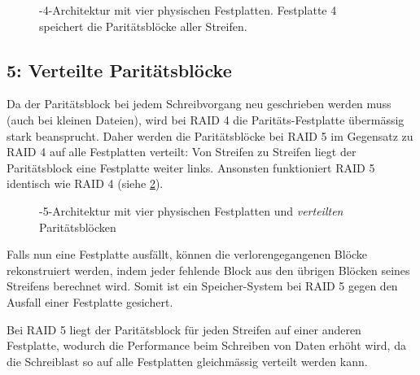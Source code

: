 \begin{figure}[H]
    \centering
    
    \caption[-4-Architektur mit vier physischen Festplatten und einer Paritäts-Festplatte]{-4-Architektur mit vier physischen Festplatten. Festplatte 4 speichert die Paritätsblöcke aller Streifen.}
    \label{fig:raid4}
\end{figure}

\subsection{ 5: Verteilte Paritätsblöcke}
Da der Paritätsblock bei jedem Schreibvorgang neu geschrieben werden muss (auch bei kleinen Dateien), wird bei \gls{RAID} 4 die Paritäts-Festplatte übermässig stark beansprucht. Daher werden die Paritätsblöcke bei \gls{RAID} 5 im Gegensatz zu \gls{RAID} 4 auf alle Festplatten verteilt: Von Streifen zu Streifen liegt der Paritätsblock eine Festplatte weiter links. Ansonsten funktioniert \gls{RAID} 5 identisch wie \gls{RAID} 4 (siehe \cref{fig:raid5}).


\begin{figure}[H]
    \centering
    
    \caption[-5-Architektur mit vier physischen Festplatten und \textit{verteilten} Paritätsblöcken]{-5-Architektur mit vier physischen Festplatten und \textit{verteilten} Paritätsblöcken}
    \label{fig:raid5}
\end{figure}


Falls nun eine Festplatte ausfällt, können die verlorengegangenen Blöcke rekonstruiert werden, indem jeder fehlende Block aus den übrigen Blöcken seines Streifens berechnet wird. Somit ist ein Speicher-System bei \gls{RAID} 5 gegen den Ausfall einer Festplatte gesichert.

Bei \gls{RAID} 5 liegt der Paritätsblock für jeden Streifen auf einer anderen Festplatte, wodurch die Performance beim Schreiben von Daten erhöht wird, da die Schreiblast so auf alle Festplatten gleichmässig verteilt werden kann.

